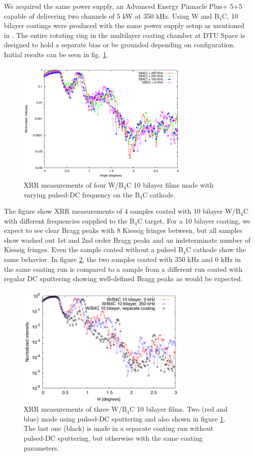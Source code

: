 We acquired the same power supply, an Advanced Energy Pinnacle Plus+ 5+5 capable of delivering two channels of 5 kW at 350 kHz. Using W and B$_4$C, 10 bilayer coatings were produced with the same power supply setup as mentioned in \cite{Pei:2009gn}. The entire rotating ring in the multilayer coating chamber at DTU Space is designed to hold a separate bias or be grounded depending on configuration. Initial results can be seen in fig. \ref{fig:wb4c-pulsed}.

\begin{figure}[!h]
	\center
	\includegraphics[height=6cm]{figures/athena/coatings/w-b4c_pulsed.pdf}
\caption{\footnotesize XRR measurements of four W/B$_4$C 10 bilayer films made with varying pulsed-DC frequency on the B$_4$C cathode.}\label{fig:wb4c-pulsed}
\end{figure}

The figure show XRR measurements of 4 samples coated with 10 bilayer W/B$_4$C with different frequencies supplied to the B$_4$C target. For a 10 bilayer coating, we expect to see clear Bragg peaks with 8 Kiessig\cite{Kiessig:1931vo} fringes between, but all samples show washed out 1st and 2nd order Bragg peaks and an indeterminate number of Kiessig fringes. Even the sample coated without a pulsed B$_4$C cathode show the same behavior. In figure \ref{fig:wb4c-nopulsed}, the two samples coated with 350 kHz and 0 kHz in the same coating run is compared to a sample from a different run coated with regular DC sputtering showing well-defined Bragg peaks as would be expected.

\begin{figure}[!h]
	\center
	\includegraphics[height=6cm]{figures/athena/coatings/w-b4c-nopulsed.pdf}
\caption{\footnotesize XRR measurements of three W/B$_4$C 10 bilayer films. Two (red and blue) made using pulsed-DC sputtering and also shown in figure \ref{fig:wb4c-pulsed}. The last one (black) is made in a separate coating run without pulsed-DC sputtering, but otherwise with the same coating parameters.}\label{fig:wb4c-nopulsed}
\end{figure}

